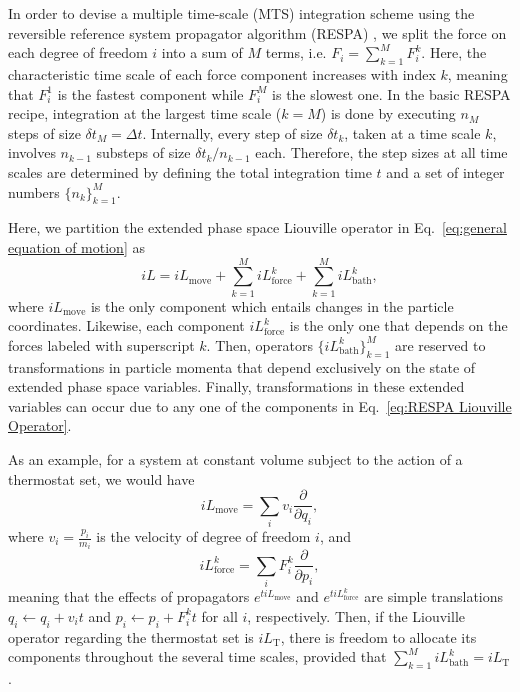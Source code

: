 \documentclass[
    journal=jctcce,
    layout=twocolumn
]{achemso}
\newcommand{\diff}[2]{\frac{\partial #2}{\partial #1}} %
\newcommand{\dof}{i}   %
\newcommand{\Liu}{i\!L}
\begin{document}
In order to devise a multiple time-scale (MTS) integration scheme using the reversible reference system propagator algorithm (RESPA) \cite{Tuckerman_1992}, we split the force on each degree of freedom $\dof$ into a sum of $M$ terms, i.e. $F_\dof = \sum_{k=1}^M F_\dof^k$.
Here, the characteristic time scale of each force component increases with index $k$, meaning that $F_\dof^1$ is the fastest component while $F_\dof^M$ is the slowest one.
In the basic RESPA recipe, integration at the largest time scale ($k=M$) is done by executing $n_M$ steps of size $\delta t_M = \Delta t$.
Internally, every step of size $\delta t_k$, taken at a time scale $k$, involves $n_{k-1}$ substeps of size $\delta t_k/n_{k-1}$ each.
Therefore, the step sizes at all time scales are determined by defining the total integration time $t$ and a set of integer numbers $\{n_k\}_{k=1}^M$.

Here, we partition the extended phase space Liouville operator in Eq.~\eqref{eq:general equation of motion} as
\begin{equation}
\label{eq:RESPA Liouville Operator}
\Liu = \Liu_\mathrm{move} + \sum_{k=1}^M \Liu_\mathrm{force}^k + \sum_{k=1}^M \Liu_\mathrm{bath}^k,
\end{equation}
where $\Liu_\mathrm{move}$ is the only component which entails changes in the particle coordinates.
Likewise, each component $\Liu_\mathrm{force}^k$ is the only one that depends on the forces labeled with superscript $k$.
Then, operators $\{\Liu_\mathrm{bath}^k\}_{k=1}^M$ are reserved to transformations in particle momenta that depend exclusively on the state of extended phase space variables.
Finally, transformations in these extended variables can occur due to any one of the components in Eq.~\eqref{eq:RESPA Liouville Operator}.

As an example, for a system at constant volume subject to the action of a thermostat set, we would have
\begin{equation}
\Liu_\mathrm{move} = \sum_\dof v_\dof \diff{q_\dof}{},
\end{equation}
where $v_\dof = \frac{p_\dof}{m_\dof}$ is the velocity of degree of freedom $\dof$, and
\begin{equation}
\Liu_\mathrm{force}^k = \sum_\dof F_\dof^k \diff{p_\dof}{},
\end{equation}
meaning that the effects of propagators $e^{t \Liu_\mathrm{move}}$ and $e^{t \Liu_\mathrm{force}^k}$ are simple translations $q_\dof \leftarrow q_\dof + v_\dof t$ and $p_\dof \leftarrow p_\dof + F_\dof^k t$ for all $\dof$, respectively.
Then, if the Liouville operator regarding the thermostat set is $\Liu_\mathrm{T}$, there is freedom to allocate its components throughout the several time scales, provided that $\sum_{k=1}^M \Liu_\mathrm{bath}^k = \Liu_\mathrm{T}$.
\end{document}
